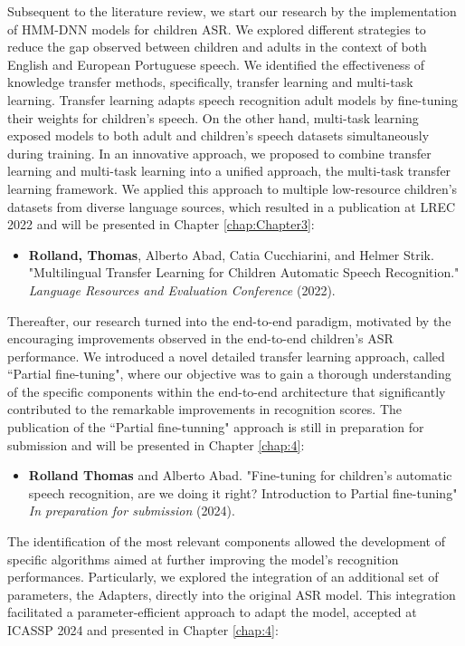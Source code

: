 Subsequent to the literature review, we start our research by the implementation of \ac{HMM-DNN} models for children \ac{ASR}. We explored different strategies to reduce the gap observed between children and adults in the context of both English and European Portuguese speech. We identified the effectiveness of knowledge transfer methods, specifically, transfer learning and multi-task learning. Transfer learning adapts speech recognition adult models by fine-tuning their weights for children's speech. On the other hand, multi-task learning exposed models to both adult and children's speech datasets simultaneously during training. In an innovative approach, we proposed to combine transfer learning and multi-task learning into a unified approach, the multi-task transfer learning framework. We applied this approach to multiple low-resource children's datasets from diverse language sources, which resulted in a publication at LREC 2022 and will be presented in Chapter \ref{chap:Chapter3}:
\begin{itemize}
    \item \textbf{Rolland, Thomas}, Alberto Abad, Catia Cucchiarini, and Helmer Strik. "Multilingual Transfer Learning for Children Automatic Speech Recognition." \textit{ Language Resources and Evaluation Conference} (2022).
\end{itemize}

Thereafter, our research turned into the end-to-end paradigm, motivated by the encouraging improvements observed in the end-to-end children's \ac{ASR} performance. We introduced a novel detailed transfer learning approach, called ``Partial fine-tuning", where our objective was to gain a thorough understanding of the specific components within the end-to-end architecture that significantly contributed to the remarkable improvements in recognition scores. The publication of the ``Partial fine-tunning" approach is still in preparation for submission and will be  presented in Chapter \ref{chap:4}:

\begin{itemize}
    \item \textbf{Rolland Thomas} and Alberto Abad. "Fine-tuning for children’s automatic speech recognition, are we doing it right? Introduction to Partial fine-tuning" \textit{In preparation for submission} (2024).
\end{itemize}


The identification of the most relevant components allowed the development of specific algorithms aimed at further improving the model's recognition performances. Particularly, we explored the integration of an additional set of parameters, the Adapters, directly into the original \ac{ASR} model. This integration facilitated a parameter-efficient approach to adapt the model, accepted at ICASSP 2024 and presented in Chapter \ref{chap:4}:

